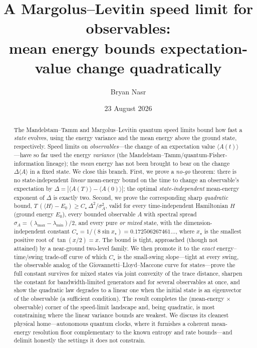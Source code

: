 \documentclass[aps,pra,twocolumn,superscriptaddress,nofootinbib,longbibliography]{revtex4-2}
\newcommand{\Ctrue}{C_{\star}}
\newcommand{\xstar}{x_{\star}}
\newcommand{\mean}[1]{\langle #1 \rangle}
\begin{document}
\title{A Margolus--Levitin speed limit for observables:\\
mean energy bounds expectation-value change quadratically}

\author{Bryan Nasr}

\date{23 August 2026}

\begin{abstract}
The Mandelstam--Tamm and Margolus--Levitin quantum speed limits bound how fast a \emph{state}
evolves, using the energy variance and the mean energy above the ground state, respectively. Speed
limits on \emph{observables}---the change of an expectation value $\mean{A(t)}$---have so far used the
energy \emph{variance} (the Mandelstam--Tamm/quantum-Fisher-information lineage); the \emph{mean} energy has
not been brought to bear on the change $\Delta\mean{A}$ in a fixed state. We close this branch. First, we prove a \emph{no-go} theorem: there is no state-independent \emph{linear}
mean-energy bound on the time to change an observable's expectation by $\Delta=|\mean{A(T)}-\mean{A(0)}|$;
the optimal \emph{state-independent} mean-energy exponent of $\Delta$ is exactly two. Second, we prove the corresponding sharp
\emph{quadratic} bound,
$T\,(\mean{H}-E_0)\ge \Ctrue\,\Delta^2/\sigma_A^2$,
valid for every time-independent Hamiltonian $H$ (ground energy $E_0$), every bounded observable $A$ with
spectral spread $\sigma_A=(\lambda_{\max}-\lambda_{\min})/2$, and every pure \emph{or mixed} state, with the
dimension-independent constant $\Ctrue=1/(8\sin \xstar)=0.172506267461\ldots$, where $\xstar$ is the smallest positive
root of $\tan(x/2)=x$. The bound is tight, approached (though not attained) by a near-ground two-level family. We then promote it to
the \emph{exact} energy--time/swing trade-off curve of which $\Ctrue$ is the small-swing slope---tight at every
swing, the observable analog of the Giovannetti--Lloyd--Maccone curve for states---prove the full constant
survives for mixed states via joint convexity of the trace distance, sharpen the constant for
bandwidth-limited generators and for several observables at once, and show the quadratic law degrades to a
linear one when the initial state is an eigenvector of the observable (a sufficient condition). The result
completes the (mean-energy $\times$ observable) corner of the speed-limit landscape and, being
quadratic, is most constraining where the linear variance bounds are weakest. We discuss its cleanest physical home---autonomous quantum clocks, where it furnishes a coherent
mean-energy resolution floor complementary to the known entropy and rate bounds---and delimit honestly the
settings it does not constrain.
\end{abstract}
\end{document}

